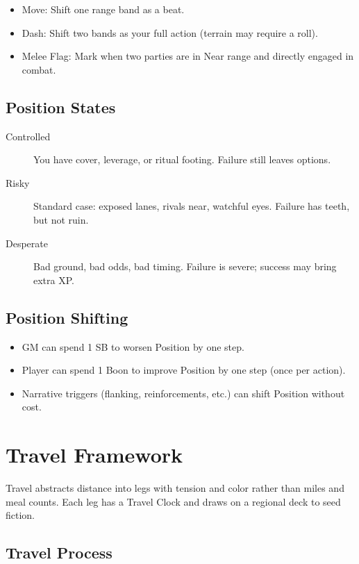 \documentclass[11pt,twoside,openany]{book}
\begin{document}
\begin{itemize}
\item Move: Shift one range band as a beat.
\item Dash: Shift two bands as your full action (terrain may require a roll).
\item Melee Flag: Mark when two parties are in Near range and directly engaged in combat.
\end{itemize}

\subsection*{Position States}

\begin{description}
\item[Controlled] You have cover, leverage, or ritual footing. Failure still leaves options.
\item[Risky] Standard case: exposed lanes, rivals near, watchful eyes. Failure has teeth, but not ruin.
\item[Desperate] Bad ground, bad odds, bad timing. Failure is severe; success may bring extra XP.
\end{description}

\subsection*{Position Shifting}

\begin{itemize}
\item GM can spend 1 SB to worsen Position by one step.
\item Player can spend 1 Boon to improve Position by one step (once per action).
\item Narrative triggers (flanking, reinforcements, etc.) can shift Position without cost.
\end{itemize}

\section*{Travel Framework} 

Travel abstracts distance into legs with tension and color rather than miles and meal counts. Each leg has a Travel Clock and draws on a regional deck to seed fiction.

\subsection*{Travel Process}
\end{document}
